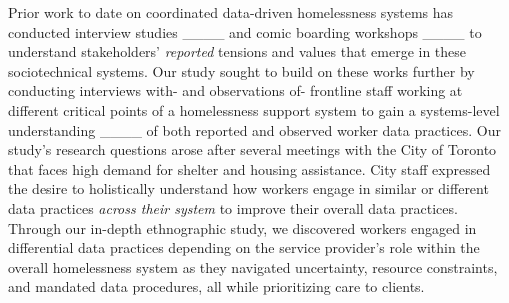 Prior work to date on coordinated data-driven homelessness systems has conducted interview studies ____ and comic boarding workshops ____ to understand stakeholders' \textit{reported} tensions and values that emerge in these sociotechnical systems. Our study sought to build on these works further by conducting interviews with- and observations of- frontline staff working at different critical points of a homelessness support system to gain a systems-level understanding ____ of both reported and observed worker data practices. Our study's research questions arose after several meetings with the City of Toronto that faces high demand for shelter and housing assistance. City staff expressed the desire to holistically understand how workers engage in similar or different data practices \textit{across their system} to improve their overall data practices. Through our in-depth ethnographic study, we discovered workers engaged in differential data practices depending on the service provider’s role within the overall homelessness system as they navigated uncertainty, resource constraints, and mandated data procedures, all while prioritizing care to clients.